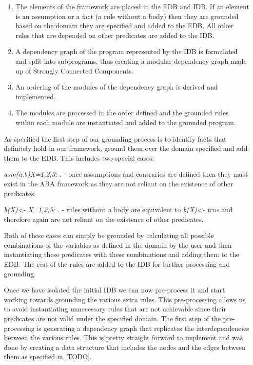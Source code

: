 \begin{enumerate}
\item The elements of the framework are placed in the EDB and IDB. If an element is an assumption or a fact (a rule without a body) then they are grounded based on the domain they are specified and added to the EDB. All other rules that are depended on other predicates are added to the IDB.
\item A dependency graph of the program represented by the IDB is formulated and split into subprograms, thus creating a modular dependency graph made up of Strongly Connected Components.
\item An ordering of the modules of the dependency graph is derived and implemented.
\item The modules are processed in the order defined and the grounded rules within each module are instantiated and added to the grounded program.
\end{enumerate}

As specified the first step of our grounding process is to identify facts that definitely hold in our framework, ground them over the domain specified and add them to the EDB. This includes two special cases:

\begin{itemize*}
\item \emph{asm(a,b)\textbraceleft X=1,2,3; \textbraceright.} - once assumptions and contraries are defined then they must exist in the ABA framework as they are not reliant on the existence of other predicates.
\item \emph{b(X)\textless- \textbraceleft X=1,2,3; \textbraceright.} - rules without a body are equivalent to \emph{b(X)\textless- true} and therefore again are not reliant on the existence of other predicates.
\end{itemize*}

Both of these cases can simply be grounded by calculating all possible combinations of the variables as defined in the domain by the user and then instantiating these predicates with these combinations and adding them to the EDB. The rest of the rules are added to the IDB for further processing and grounding.

Once we have isolated the initial IDB we can now pre-process it and start working towards grounding the various extra rules. This pre-processing allows us to avoid instantiating unnecessary rules that are not achievable since their predicates are not valid under the specified domain. The first step of the pre-processing is generating a dependency graph that replicates the interdependencies between the various rules. This is pretty straight forward to implement and was done by creating a data structure that includes the nodes and the edges between them as specified in  [TODO].

